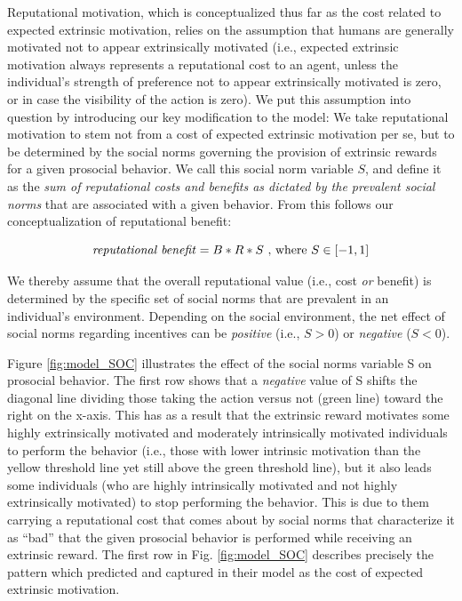 \documentclass[AER]{AEA}
\begin{document}
Reputational motivation, which is conceptualized thus far as the cost related to expected extrinsic motivation, relies on the assumption that humans are generally motivated not to appear extrinsically motivated (i.e., expected extrinsic motivation always represents a reputational cost to an agent, unless the individual’s strength of preference not to appear extrinsically motivated is zero, or in case the visibility of the action is zero). We put this assumption into question by introducing our key modification to the model: We take reputational motivation to stem not from a cost of expected extrinsic motivation per se, but to be determined by the social norms governing the provision of extrinsic rewards for a given prosocial behavior. We call this social norm variable $S$, and define it as the \textit{sum of reputational costs and benefits as dictated by the prevalent social norms} that are associated with a given behavior. From this follows our conceptualization of reputational benefit:

$$\mbox{\textit{reputational benefit}} = B * R * S \mbox{ , where  } S \in [-1,1]$$

We thereby assume that the overall reputational value (i.e., cost \textit{or} benefit) is determined by the specific set of social norms that are prevalent in an individual’s environment. Depending on the social environment, the net effect of social norms regarding incentives can be \textit{positive} (i.e., $S > 0$) or \textit{negative} ($S < 0$).

Figure \ref{fig:model_SOC} illustrates the effect of the social norms variable S on prosocial behavior. The first row shows that a \textit{negative} value of S shifts the diagonal line dividing those taking the action versus not (green line) toward the right on the x-axis. This has as a result that the extrinsic reward motivates some highly extrinsically motivated and moderately intrinsically motivated individuals to perform the behavior (i.e., those with lower intrinsic motivation than the yellow threshold line yet still above the green threshold line), but it also leads some individuals (who are highly intrinsically motivated and not highly extrinsically motivated) to stop performing the behavior. This is due to them carrying a reputational cost that comes about by social norms that characterize it as “bad” that the given prosocial behavior is performed while receiving an extrinsic reward. The first row in Fig. \ref{fig:model_SOC} describes precisely the pattern which \cite{benabou_incentives_2006} predicted and captured in their model as the cost of expected extrinsic motivation.
\end{document}
